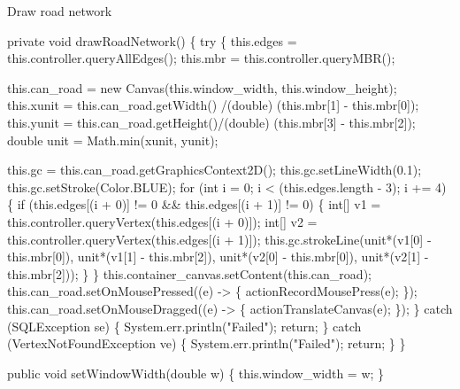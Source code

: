 \nwenddocs{}\endmoddef{}
\LA{}Draw road network~{\nwtagstyle{}}\RA{}
\nwendcode{}\nwdocspar

\nwenddocs{}\endmoddef{}
private void drawRoadNetwork() \{
  try \{
    this.edges    = this.controller.queryAllEdges();
    this.mbr      = this.controller.queryMBR();

    this.can_road = new Canvas(this.window_width, this.window_height);
    this.xunit    = this.can_road.getWidth() /(double) (this.mbr[1] - this.mbr[0]);
    this.yunit    = this.can_road.getHeight()/(double) (this.mbr[3] - this.mbr[2]);
    double unit   = Math.min(xunit, yunit);

    this.gc = this.can_road.getGraphicsContext2D();
    this.gc.setLineWidth(0.1);
    this.gc.setStroke(Color.BLUE);
    for (int i = 0; i < (this.edges.length - 3); i += 4) \{
      if (this.edges[(i + 0)] != 0 && this.edges[(i + 1)] != 0) \{
        int[] v1 = this.controller.queryVertex(this.edges[(i + 0)]);
        int[] v2 = this.controller.queryVertex(this.edges[(i + 1)]);
        this.gc.strokeLine(unit*(v1[0] - this.mbr[0]), unit*(v1[1] - this.mbr[2]),
                           unit*(v2[0] - this.mbr[0]), unit*(v2[1] - this.mbr[2]));
      \}
    \}
    this.container_canvas.setContent(this.can_road);
    this.can_road.setOnMousePressed((e) -> \{ actionRecordMousePress(e); \});
    this.can_road.setOnMouseDragged((e) -> \{ actionTranslateCanvas(e); \});
  \} catch (SQLException se) \{
    System.err.println("Failed");
    return;
  \} catch (VertexNotFoundException ve) \{
    System.err.println("Failed");
    return;
  \}
\}
\nwendcode{}\nwdocspar

\nwenddocs{}\endmoddef{}
public void setWindowWidth(double w) \{
  this.window_width = w;
\}
\nwendcode{}\nwdocspar


